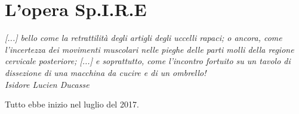 
\chapter{L'opera Sp.I.R.E}
\label{chp:L'opera Sp.I.R.E}

	\begin{flushright}
		\textit{[...] bello come la retrattilità degli artigli degli uccelli rapaci; o ancora, come l'incertezza dei movimenti muscolari nelle pieghe delle parti molli della regione cervicale posteriore; [...] e soprattutto, come l'incontro fortuito su un tavolo di dissezione di una macchina da cucire e di un ombrello! \\
		Isidore Lucien Ducasse}
	\end{flushright}

Tutto ebbe inizio nel luglio del 2017.


